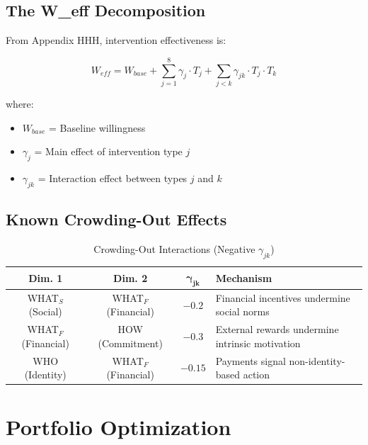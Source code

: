 \subsection{The W\_eff Decomposition}

From Appendix HHH, intervention effectiveness is:

\begin{equation}
\boxed{
W_{eff} = W_{base} + \sum_{j=1}^{8} \gamma_j \cdot T_j + \sum_{j<k} \gamma_{jk} \cdot T_j \cdot T_k
}
\label{eq:weff}
\end{equation}

where:
\begin{itemize}
\item $W_{base}$ = Baseline willingness
\item $\gamma_j$ = Main effect of intervention type $j$
\item $\gamma_{jk}$ = Interaction effect between types $j$ and $k$
\end{itemize}

\subsection{Known Crowding-Out Effects}

\begin{table}[htbp]
\centering
\caption{Crowding-Out Interactions (Negative $\gamma_{jk}$)}
\label{tab:crowding-out}
\renewcommand{\arraystretch}{1.3}
\begin{tabular}{@{}cccp{6cm}@{}}
\toprule
\textbf{Dim. 1} & \textbf{Dim. 2} & $\boldsymbol{\gamma_{jk}}$ & \textbf{Mechanism} \\
\midrule
WHAT$_S$ (Social) & WHAT$_F$ (Financial) & $-0.2$ & Financial incentives undermine social norms \\
WHAT$_F$ (Financial) & HOW (Commitment) & $-0.3$ & External rewards undermine intrinsic motivation \\
WHO (Identity) & WHAT$_F$ (Financial) & $-0.15$ & Payments signal non-identity-based action \\
\bottomrule
\end{tabular}
\end{table}


\section{Portfolio Optimization}
\label{sec:calc-portfolio}

